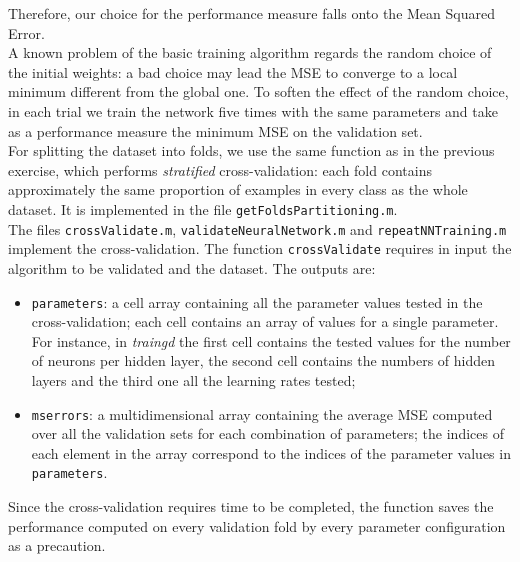 \documentclass{article}
\begin{document}
 Therefore, our choice for the performance measure falls onto the Mean Squared Error.\\
A known problem of the basic training algorithm regards the random choice of the initial weights: a bad choice may lead the MSE to converge to a local minimum different from the global one. To soften the effect of the random choice, in each trial we train the network five times with the same parameters and take as a performance measure the minimum MSE on the validation set.\\
For splitting the dataset into folds, we use the same function as in the previous exercise, which performs \emph{stratified} cross-validation: each fold contains approximately the same proportion of examples in every class as the whole dataset. It is implemented in the file \verb$getFoldsPartitioning.m$.\\
The files \verb$crossValidate.m$, \verb$validateNeuralNetwork.m$ and \verb$repeatNNTraining.m$ implement the cross-validation. The function \verb$crossValidate$ requires in input the algorithm to be validated and the dataset. The outputs are:
\begin{itemize}
	\item \verb$parameters$: a cell array containing all the parameter values tested in the cross-validation; each cell contains an array of values for a single parameter. For instance, in \emph{traingd} the first cell contains the tested values for the number of neurons per hidden layer, the second cell contains the numbers of hidden layers and the third one all the learning rates tested;
	\item \verb$mserrors$: a multidimensional array containing the average MSE computed over all the validation sets for each combination of parameters; the indices of each element in the array correspond to the indices of the parameter values in \verb$parameters$.
\end{itemize}
Since the cross-validation requires time to be completed, the function saves the performance computed on every validation fold by every parameter configuration as a precaution.
\end{document}
